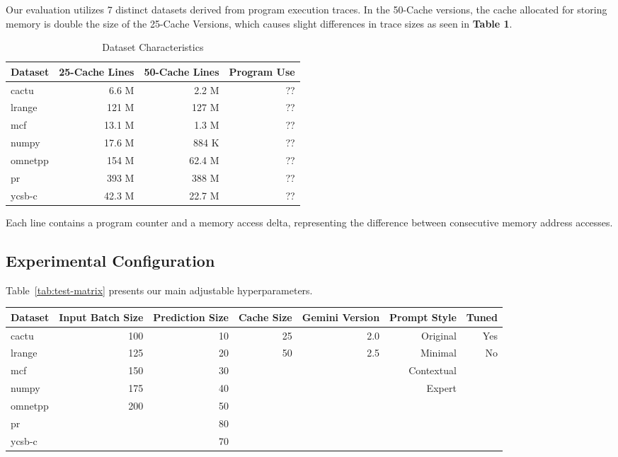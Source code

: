 \documentclass[sigconf,authorversion,nonacm]{acmart}
\begin{document}
Our evaluation utilizes 7 distinct datasets derived from program execution traces. In the 50-Cache versions, the cache allocated for storing memory is double the size of the 25-Cache Versions, which causes slight differences in trace sizes as seen in \textbf{Table 1}. 

\begin{table}[h]
\centering
\caption{Dataset Characteristics}
\label{tab:datasets}
\begin{tabular}{@{}lrrr@{}}
\toprule
Dataset & 25-Cache Lines & 50-Cache Lines & Program Use\\
\midrule
cactu & 6.6 M & 2.2 M & ??\\
lrange & 121 M & 127 M & ??\\
mcf & 13.1 M & 1.3 M & ??\\
numpy & 17.6 M & 884 K & ??\\
omnetpp & 154 M & 62.4 M & ?? \\
pr & 393 M & 388 M & ??\\
ycsb-c & 42.3 M & 22.7 M & ??\\
\bottomrule
\end{tabular}
\end{table}

Each line contains a program counter and a memory access delta, representing the difference between consecutive memory address accesses.

\subsection{Experimental Configuration}

Table~\ref{tab:test-matrix} presents our main adjustable hyperparameters. 

\begin{table*}[t]
\centering
\caption{Experimental Test Configuration Hyperparameters}
\label{tab:test-matrix}
\begin{tabular}{@{}lrrrrrr@{}}
\toprule
Dataset & Input Batch Size & Prediction Size & Cache Size & Gemini Version & Prompt Style & Tuned\\
\midrule
cactu & 100 & 10 & 25 & 2.0 & Original & Yes\\
lrange & 125 & 20 & 50 & 2.5 & Minimal & No\\
mcf & 150 & 30 &  & & Contextual & \\
numpy & 175 & 40 &  & & Expert & \\
omnetpp & 200 & 50 &  &  &  & \\
pr & & 80 &  &  &  & \\
ycsb-c & & 70 & & &  &  \\

\bottomrule
\end{tabular}
\end{table*}
\end{document}
